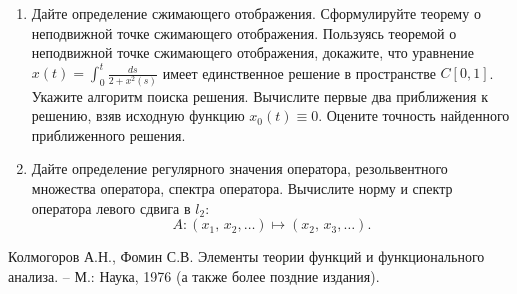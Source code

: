 %
%

\begin{enumerate}[resume]
\item Дайте определение сжимающего отображения. Сформулируйте теорему о неподвижной точке сжимающего отображения. 
Пользуясь теоремой о неподвижной точке сжимающего отображения, докажите, что уравнение $x(t) =\displaystyle{\int_0^t \frac{ds}{2+x^2(s)}}$ имеет единственное решение в пространстве $C[0,1]$. Укажите алгоритм поиска решения. Вычислите первые два приближения к решению, взяв исходную функцию $x_0(t) \equiv 0$. Оцените точность найденного приближенного решения. 

\item Дайте определение регулярного значения оператора, резольвентного множества оператора, спектра оператора. 
Вычислите норму и спектр оператора левого сдвига в $l_2$:  $$A: (x_1,\,x_2,\ldots)\mapsto(x_2,\,x_3,\ldots).$$
\end{enumerate}

\bigskip
[1]  Колмогоров А.Н., Фомин С.В. Элементы теории функций и функционального анализа. – М.: Наука, 1976 (а также более поздние издания).





